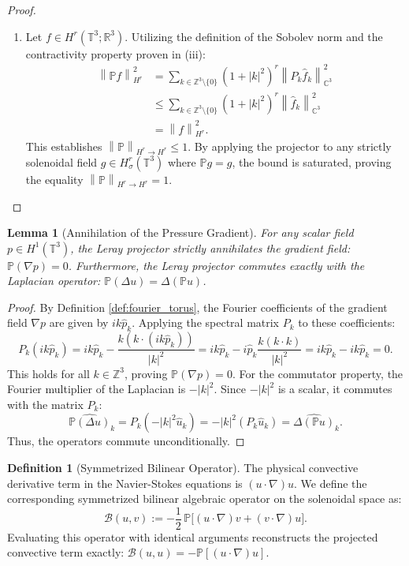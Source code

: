\documentclass[12pt,a4paper]{article}
\theoremstyle{plain}
\newtheorem{lemma}[theorem]{Lemma}
\theoremstyle{definition}
\newtheorem{definition}[theorem]{Definition}
\theoremstyle{remark}
\newcommand{\T}{\mathbb{T}}
\newcommand{\Z}{\mathbb{Z}}
\newcommand{\R}{\mathbb{R}}
\newcommand{\norm}[1]{\left\|#1\right\|}
\newcommand{\grad}{\nabla}
\newcommand{\BB}{\mathcal{B}}
\newcommand{\PP}{\mathbb{P}}
\begin{document}
\begin{proof}
\begin{enumerate}[label=(\roman*)]
  \item Let $f \in H^r(\T^3;\R^3)$. Utilizing the definition of the Sobolev norm and the contractivity property proven in (iii):
  \begin{align*}
    \norm{\PP f}_{H^r}^2
    &= \sum_{k\in\Z^3\setminus\{0\}} (1+|k|^2)^r \norm{P_k\hat{f}_k}_{\mathbb{C}^3}^2 \\
    &\le \sum_{k\in\Z^3\setminus\{0\}} (1+|k|^2)^r \norm{\hat{f}_k}_{\mathbb{C}^3}^2 \\
    &= \norm{f}_{H^r}^2.
  \end{align*}
  This establishes $\norm{\PP}_{H^r\to H^r} \le 1$. By applying the projector to any strictly solenoidal field $g \in H^r_\sigma(\T^3)$ where $\PP g = g$, the bound is saturated, proving the equality $\norm{\PP}_{H^r\to H^r} = 1$.
\end{enumerate}
\end{proof}

\begin{lemma}[Annihilation of the Pressure Gradient]
\label{lem:pressure_annihilation}
For any scalar field $p \in H^1(\T^3)$, the Leray projector strictly annihilates the gradient field: $\PP(\grad p) = 0$. Furthermore, the Leray projector commutes exactly with the Laplacian operator: $\PP(\Delta u) = \Delta(\PP u)$.
\end{lemma}

\begin{proof}
By Definition \ref{def:fourier_torus}, the Fourier coefficients of the gradient field $\grad p$ are given by $i k \hat{p}_k$. Applying the spectral matrix $P_k$ to these coefficients:
\[
  P_k(i k \hat{p}_k) = i k \hat{p}_k - \frac{k(k \cdot (i k \hat{p}_k))}{|k|^2} = i k \hat{p}_k - i \hat{p}_k \frac{k(k \cdot k)}{|k|^2} = i k \hat{p}_k - i k \hat{p}_k = 0.
\]
This holds for all $k \in \Z^3$, proving $\PP(\grad p) = 0$.
For the commutator property, the Fourier multiplier of the Laplacian is $-|k|^2$. Since $-|k|^2$ is a scalar, it commutes with the matrix $P_k$:
\[
  \widehat{\PP(\Delta u)}_k = P_k(-|k|^2 \hat{u}_k) = -|k|^2 (P_k \hat{u}_k) = \widehat{\Delta(\PP u)}_k.
\]
Thus, the operators commute unconditionally.
\end{proof}

\begin{definition}[Symmetrized Bilinear Operator]
\label{def:B}
The physical convective derivative term in the Navier-Stokes equations is $(u\cdot\grad)u$. We define the corresponding symmetrized bilinear algebraic operator on the solenoidal space as:
\[
  \BB(u,v)
  :=
  -\frac{1}{2}\,\PP\Big[(u\cdot\grad)v + (v\cdot\grad)u\Big].
\]
Evaluating this operator with identical arguments reconstructs the projected convective term exactly: $\BB(u,u) = -\PP[(u\cdot\grad)u]$.
\end{definition}
\end{document}
